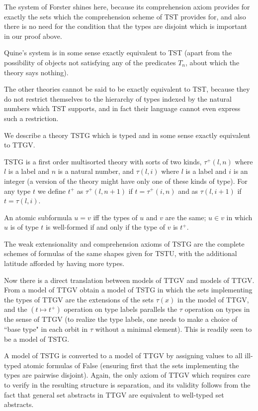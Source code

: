 \documentclass[12pt]{article}
\begin{document}
The system of Forster shines here, because its comprehension axiom provides for exactly the sets which the comprehension scheme of TST provides for, and also there is no need for the condition that the types are disjoint which is important in our proof above.

Quine's system is in some sense exactly equivalent to TST (apart from the possibility of objects not satisfying any of the predicates $T_n$, about which the theory says nothing).

The other theories cannot be said to be exactly equivalent to TST, because they do not restrict themselves to the hierarchy of types indexed by the natural numbers which TST supports, and in fact their language cannot even express such a restriction.

We describe a theory TSTG which is typed and in some sense exactly equivalent to TTGV.

TSTG is a first order multisorted theory with sorts of two kinds, $\tau^+(l,n)$ where $l$ is a label and $n$ is a natural number, and $\tau(l,i)$ where $l$ is a label and $i$ is an integer (a version of the theory might have only one of these kinds of type).  For any type $t$ we define $t^+$ as $\tau^+(l,n+1)$ if $t=\tau^+(i,n)$ and as $\tau(l,i+1)$ if $t=\tau(l,i)$.

An atomic subformula $u=v$ iff the types of $u$ and $v$ are the same; $u \in v$ in which $u$ is of type $t$ is well-formed if and only if the type of $v$ is $t^+$.

The weak extensionality and comprehension axioms of TSTG are the complete schemes of formulas of the same shapes given for TSTU, with the additional latitude afforded by having more types.

Now there is a direct translation between models of TTGV and models of TTGV.  From a model of TTGV obtain a model of TSTG in which the sets implementing the types of TTGV are the extensions of the sets $\tau(x)$ in the model of TTGV, and the $(t \mapsto t^+)$ operation on type labels parallels the $\tau$ operation on types in the sense of TTGV (to realize the type labels, one needs to make a choice of ``base type" in each orbit in $\tau$ without a minimal element).  This is readily seen to be a model of TSTG.

A model of TSTG is converted to a model of TTGV by assigning values to all ill-typed atomic formulas of False
(ensuring first that the sets implementing the types are pairwise disjoint).  Again, the only axiom of TTGV which requires care to verify in the resulting structure is separation, and its validity follows from the fact
that general set abstracts in TTGV are equivalent to well-typed set abstracts.
\end{document}
